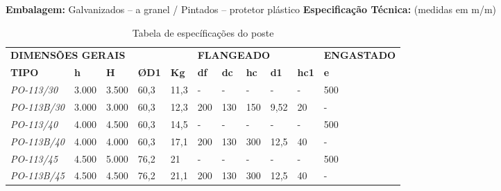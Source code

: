 \begin{itemize}
	{\bf Embalagem:} Galvanizados – a granel  /  Pintados – protetor plástico
	{\bf Especificação Técnica:} (medidas em m/m)
	
\begin{table}[H]
\center
\caption{Tabela de específicações do poste}
\begin{tabular}{lllllllllll}
 &  &  &  &  &  &  &  &  &  &  \\ \hline
\multicolumn{5}{|l|}{{\bf DIMENSÕES GERAIS}} & \multicolumn{5}{l|}{{\bf FLANGEADO}} & \multicolumn{1}{l|}{{\bf ENGASTADO}} \\ \hline
\multicolumn{1}{|l|}{{\bf TIPO}} & \multicolumn{1}{l|}{{\bf h}} & \multicolumn{1}{l|}{{\bf H}} & \multicolumn{1}{l|}{{\bf ØD1}} & \multicolumn{1}{l|}{{\bf Kg}} & \multicolumn{1}{l|}{{\bf df}} & \multicolumn{1}{l|}{{\bf dc}} & \multicolumn{1}{l|}{{\bf hc}} & \multicolumn{1}{l|}{{\bf d1}} & \multicolumn{1}{l|}{{\bf hc1}} & \multicolumn{1}{l|}{{\bf e}} \\ \hline
\multicolumn{1}{|l|}{{\it PO-113/30}} & \multicolumn{1}{l|}{3.000} & \multicolumn{1}{l|}{3.500} & \multicolumn{1}{l|}{60,3} & \multicolumn{1}{l|}{11,3} & \multicolumn{1}{l|}{-} & \multicolumn{1}{l|}{-} & \multicolumn{1}{l|}{-} & \multicolumn{1}{l|}{-} & \multicolumn{1}{l|}{-} & \multicolumn{1}{l|}{500} \\ \hline
\multicolumn{1}{|l|}{{\it PO-113B/30}} & \multicolumn{1}{l|}{3.000} & \multicolumn{1}{l|}{3.000} & \multicolumn{1}{l|}{60,3} & \multicolumn{1}{l|}{12,3} & \multicolumn{1}{l|}{200} & \multicolumn{1}{l|}{130} & \multicolumn{1}{l|}{150} & \multicolumn{1}{l|}{9,52} & \multicolumn{1}{l|}{20} & \multicolumn{1}{l|}{-} \\ \hline
\multicolumn{1}{|l|}{{\it PO-113/40}} & \multicolumn{1}{l|}{4.000} & \multicolumn{1}{l|}{4.500} & \multicolumn{1}{l|}{60,3} & \multicolumn{1}{l|}{14,5} & \multicolumn{1}{l|}{-} & \multicolumn{1}{l|}{-} & \multicolumn{1}{l|}{-} & \multicolumn{1}{l|}{-} & \multicolumn{1}{l|}{-} & \multicolumn{1}{l|}{500} \\ \hline
\multicolumn{1}{|l|}{{\it PO-113B/40}} & \multicolumn{1}{l|}{4.000} & \multicolumn{1}{l|}{4.000} & \multicolumn{1}{l|}{60,3} & \multicolumn{1}{l|}{17,1} & \multicolumn{1}{l|}{200} & \multicolumn{1}{l|}{130} & \multicolumn{1}{l|}{300} & \multicolumn{1}{l|}{12,5} & \multicolumn{1}{l|}{40} & \multicolumn{1}{l|}{-} \\ \hline
\multicolumn{1}{|l|}{{\it PO-113/45}} & \multicolumn{1}{l|}{4.500} & \multicolumn{1}{l|}{5.000} & \multicolumn{1}{l|}{76,2} & \multicolumn{1}{l|}{21} & \multicolumn{1}{l|}{-} & \multicolumn{1}{l|}{-} & \multicolumn{1}{l|}{-} & \multicolumn{1}{l|}{-} & \multicolumn{1}{l|}{-} & \multicolumn{1}{l|}{500} \\ \hline
\multicolumn{1}{|l|}{{\it PO-113B/45}} & \multicolumn{1}{l|}{4.500} & \multicolumn{1}{l|}{4.500} & \multicolumn{1}{l|}{76,2} & \multicolumn{1}{l|}{21,1} & \multicolumn{1}{l|}{200} & \multicolumn{1}{l|}{130} & \multicolumn{1}{l|}{300} & \multicolumn{1}{l|}{12,5} & \multicolumn{1}{l|}{40} & \multicolumn{1}{l|}{-} \\ \hline
\end{tabular}
\end{table}


\end{itemize}
